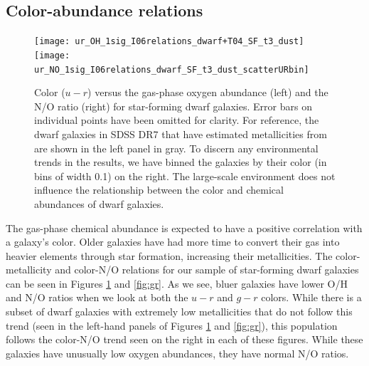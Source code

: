 \subsection{Color-abundance relations}

\begin{figure}
    \centering
    \texttt{[image: ur\_OH\_1sig\_I06relations\_dwarf+T04\_SF\_t3\_dust]}
    \texttt{[image: ur\_NO\_1sig\_I06relations\_dwarf\_SF\_t3\_dust\_scatterURbin]}
    \caption{Color ($u-r$) versus the gas-phase oxygen abundance (left) and the 
    N/O ratio (right) for star-forming dwarf galaxies.  Error bars on individual 
    points have been omitted for clarity.  For reference, the dwarf galaxies in 
    SDSS DR7 that have estimated metallicities from \cite{Tremonti04} are shown 
    in the left panel in gray.  To discern any environmental trends in the 
    results, we have binned the galaxies by their color (in bins of width 0.1) 
    on the right.  The large-scale environment does not influence the 
    relationship between the color and chemical abundances of dwarf galaxies.}
    \label{fig:ur}
\end{figure}

The gas-phase chemical abundance is expected to have a positive correlation with 
a galaxy's color.  Older galaxies have had more time to convert their gas into 
heavier elements through star formation, increasing their metallicities.  The 
color-metallicity and color-N/O relations for our sample of star-forming dwarf 
galaxies can be seen in Figures \ref{fig:ur} and \ref{fig:gr}.  As we see, bluer 
galaxies have lower O/H and N/O ratios when we look at both the $u-r$ and $g-r$ 
colors.  While there is a subset of dwarf galaxies with extremely low 
metallicities that do not follow this trend (seen in the left-hand panels of 
Figures \ref{fig:ur} and \ref{fig:gr}), this population follows the color-N/O 
trend seen on the right in each of these figures.  While these galaxies have 
unusually low oxygen abundances, they have normal N/O ratios.

